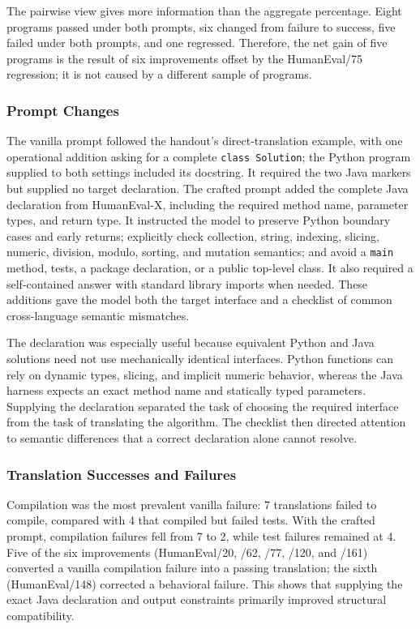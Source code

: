 \documentclass[sigconf,nonacm]{acmart}
\begin{document}
The pairwise view gives more information than the aggregate percentage. Eight
programs passed under both prompts, six changed from failure to success, five
failed under both prompts, and one regressed. Therefore, the net gain of five
programs is the result of six improvements offset by the HumanEval/75
regression; it is not caused by a different sample of programs.

\subsubsection{Prompt Changes}\hfill\break
The vanilla prompt followed the handout's direct-translation example, with one
operational addition asking for a complete \texttt{class Solution}; the Python
program supplied to both settings included its docstring. It required the two
Java markers but supplied no target declaration. The crafted prompt
added the complete Java declaration from HumanEval-X, including the required
method name, parameter types, and return type. It instructed the model to
preserve Python boundary cases and early returns; explicitly check collection,
string, indexing, slicing, numeric, division, modulo, sorting, and mutation
semantics; and avoid a \texttt{main} method, tests, a package declaration, or a
public top-level class. It also required a self-contained answer with standard
library imports when needed. These additions gave the model both the target
interface and a checklist of common cross-language semantic mismatches.

The declaration was especially useful because equivalent Python and Java
solutions need not use mechanically identical interfaces. Python functions can
rely on dynamic types, slicing, and implicit numeric behavior, whereas the Java
harness expects an exact method name and statically typed parameters. Supplying
the declaration separated the task of choosing the required interface from the
task of translating the algorithm. The checklist then directed attention to
semantic differences that a correct declaration alone cannot resolve.

\subsubsection{Translation Successes and Failures}\hfill\break
Compilation was the most prevalent vanilla failure: 7 translations failed to
compile, compared with 4 that compiled but failed tests. With the crafted
prompt, compilation failures fell from 7 to 2, while test failures remained at
4. Five of the six improvements (HumanEval/20, /62, /77, /120, and /161)
converted a vanilla compilation failure into a passing translation; the sixth
(HumanEval/148) corrected a behavioral failure. This shows that supplying the
exact Java declaration and output constraints primarily improved structural
compatibility.
\end{document}
